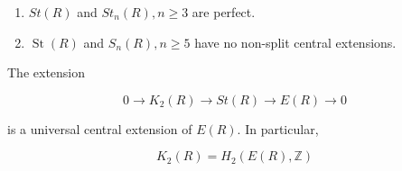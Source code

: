  \begin{prop}
    \begin{enumerate}
        \item $S t(R)$ and $S t_n(R), n \geq 3$ are perfect.
\item $\operatorname{St}(R)$ and $S_n(R), n \geq 5$ have no non-split central extensions.
    \end{enumerate}
\end{prop}
\begin{coro}
    The extension

    $$
    0 \longrightarrow K_2(R) \longrightarrow S t(R) \longrightarrow E(R) \longrightarrow 0
    $$
    
    is a universal central extension of $E(R)$. In particular,
    
    $$
    K_2(R)=H_2(E(R), \mathbb{Z})
    $$   
\end{coro}
 








